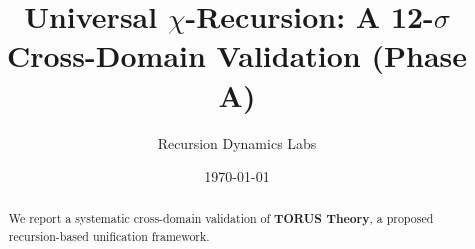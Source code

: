 \documentclass{article}
\title{Universal $\chi$-Recursion: A 12-$\sigma$ Cross-Domain Validation (Phase A)}
\author{Recursion Dynamics Labs}
\date{\today}
\begin{document}
\maketitle
\begin{abstract}
We report a systematic cross-domain validation of \textbf{TORUS Theory}, a proposed recursion-based unification framework.
\end{abstract}
\end{document}
